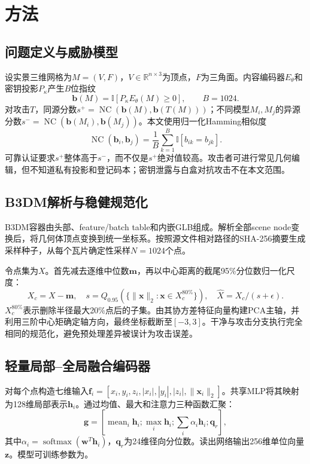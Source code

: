 \documentclass[UTF8,fontset=fandol,11pt]{ctexart}
\begin{document}
\section{方法}
\subsection{问题定义与威胁模型}
设实景三维网格为$M=(V,F)$，$V\in\mathbb R^{n\times3}$为顶点，$F$为三角面。内容编码器$E_\theta$和密钥投影$P_\kappa$产生$B$位指纹
\begin{equation}\bm b(M)=\mathbb I[P_\kappa E_\theta(M)\ge0],\qquad B=1024.\end{equation}
对攻击$T$，同源分数$s^+=\operatorname{NC}(\bm b(M),\bm b(T(M)))$；不同模型$M_i,M_j$的异源分数$s^-=\operatorname{NC}(\bm b(M_i),\bm b(M_j))$。本文使用归一化Hamming相似度
\begin{equation}\operatorname{NC}(\bm b_i,\bm b_j)=\frac1B\sum_{k=1}^{B}\mathbb I[b_{ik}=b_{jk}].\end{equation}
可靠认证要求$s^+$整体高于$s^-$，而不仅是$s^+$绝对值较高。攻击者可进行常见几何编辑，但不知道私有投影和登记码本；密钥泄露与白盒对抗攻击不在本文范围。

\subsection{B3DM解析与稳健规范化}
B3DM容器由头部、feature/batch table和内嵌GLB组成。解析全部scene node变换后，将几何体顶点变换到统一坐标系。按照源文件相对路径的SHA-256摘要生成采样种子，从每个瓦片确定性采样$N=1024$个点。

令点集为$X$。首先减去逐维中位数$\bm m$，再以中心距离的截尾95\%分位数归一化尺度：
\begin{equation}X_c=X-\bm m,\quad s=Q_{0.95}(\{\|\bm x\|_2:\bm x\in X_c^{80\%}\}),\quad \widehat X=X_c/(s+\epsilon).\end{equation}
$X_c^{80\%}$表示删除半径最大20\%点后的子集。由其协方差特征向量构建PCA主轴，并利用三阶中心矩确定轴方向，最终坐标截断至$[-3,3]$。干净与攻击分支执行完全相同的规范化，避免预处理差异被误计为攻击误差。

\subsection{轻量局部--全局融合编码器}
对每个点构造七维输入$\bm f_i=[x_i,y_i,z_i,|x_i|,|y_i|,|z_i|,\|\bm x_i\|_2]$。共享MLP将其映射为128维局部表示$\bm h_i$。通过均值、最大和注意力三种函数汇聚：
\begin{equation}\bm g=[\operatorname{mean}_i\bm h_i;\operatorname{max}_i\bm h_i;\sum_i\alpha_i\bm h_i;\bm q_r],\end{equation}
其中$\alpha_i=\operatorname{softmax}(\bm w^T\bm h_i)$，$\bm q_r$为24维径向分位数。读出网络输出256维单位向量$\bm z$。模型可训练参数为\ModelParams。
\end{document}
